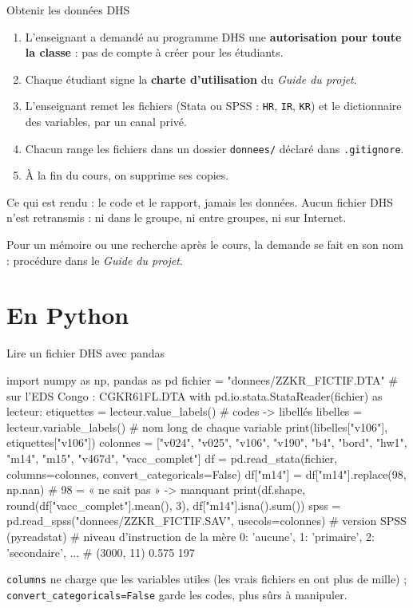 \documentclass[aspectratio=169,11pt]{beamer}
\begin{document}
\begin{frame}{Obtenir les données DHS}
  \begin{enumerate}
    \item L'enseignant a demandé au programme DHS une \textbf{autorisation pour toute la classe} : pas de compte à créer pour les étudiants.
    \item Chaque étudiant signe la \textbf{charte d'utilisation} du \emph{Guide du projet}.
    \item L'enseignant remet les fichiers (Stata ou SPSS : \texttt{HR}, \texttt{IR}, \texttt{KR}) et le dictionnaire des variables, par un canal privé.
    \item Chacun range les fichiers dans un dossier \texttt{donnees/} déclaré dans \texttt{.gitignore}.
    \item À la fin du cours, on supprime ses copies.
  \end{enumerate}
  \begin{aretenir}
    Ce qui est rendu : le code et le rapport, jamais les données. Aucun fichier DHS n'est retransmis : ni dans le groupe, ni entre groupes, ni sur Internet.
  \end{aretenir}
  {\small\color{cnfGris}Pour un mémoire ou une recherche après le cours, la demande se fait en son nom : procédure dans le \emph{Guide du projet}.}
\end{frame}

\section{En Python}

\begin{frame}[fragile]{Lire un fichier DHS avec pandas}
\begin{python}[basicstyle=\ttfamily\scriptsize]
import numpy as np, pandas as pd
fichier = "donnees/ZZKR_FICTIF.DTA"                   # sur l'EDS Congo : CGKR61FL.DTA
with pd.io.stata.StataReader(fichier) as lecteur:
    etiquettes = lecteur.value_labels()               # codes -> libellés
    libelles = lecteur.variable_labels()              # nom long de chaque variable
print(libelles["v106"], etiquettes["v106"])
colonnes = ["v024", "v025", "v106", "v190", "b4", "bord", "hw1", "m14", "m15", "v467d",
            "vacc_complet"]
df = pd.read_stata(fichier, columns=colonnes, convert_categoricals=False)
df["m14"] = df["m14"].replace(98, np.nan)             # 98 = « ne sait pas » -> manquant
print(df.shape, round(df["vacc_complet"].mean(), 3), df["m14"].isna().sum())
spss = pd.read_spss("donnees/ZZKR_FICTIF.SAV", usecols=colonnes)   # version SPSS (pyreadstat)
# niveau d'instruction de la mère {0: 'aucune', 1: 'primaire', 2: 'secondaire', ...}
# (3000, 11) 0.575 197
\end{python}
\vskip-1mm
{\small\color{cnfGris}\texttt{columns} ne charge que les variables utiles (les vrais fichiers en ont plus de mille) ; \texttt{convert\_categoricals=False} garde les codes, plus sûrs à manipuler.}
\end{frame}
\end{document}
